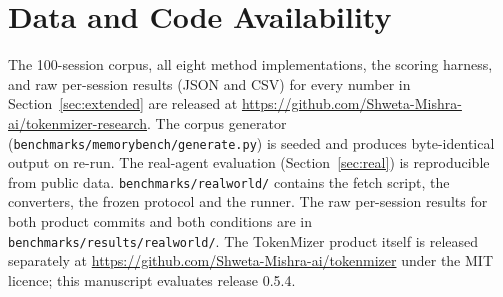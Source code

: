 \documentclass[journal]{IEEEtran}
\begin{document}
\section*{Data and Code Availability}
\label{sec:availability}

The 100-session corpus, all eight method implementations, the
scoring harness, and raw per-session results (JSON and CSV) for
every number in Section~\ref{sec:extended} are released at
\url{https://github.com/Shweta-Mishra-ai/tokenmizer-research}.
The corpus generator (\texttt{benchmarks/memorybench/generate.py})
is seeded and produces byte-identical output on re-run.
The real-agent evaluation (Section~\ref{sec:real}) is
reproducible from public data. \texttt{benchmarks/realworld/}
contains the fetch script, the converters, the frozen protocol
and the runner. The raw per-session results for both product
commits and both conditions are in
\texttt{benchmarks/results/realworld/}.
The TokenMizer product itself is released separately at
\url{https://github.com/Shweta-Mishra-ai/tokenmizer} under the
MIT licence; this manuscript evaluates release 0.5.4.
\end{document}
